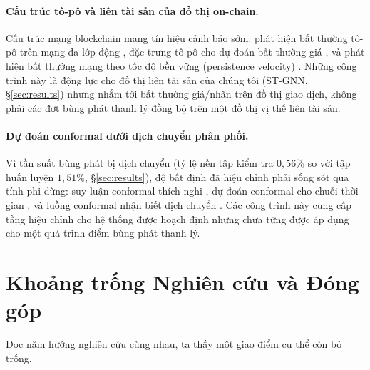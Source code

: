 \documentclass[11pt,a4paper]{article}
\begin{document}
\paragraph{Cấu trúc tô-pô và liên tài sản của đồ thị on-chain.} Cấu trúc mạng blockchain mang tín hiệu cảnh báo sớm: phát hiện bất thường tô-pô trên mạng đa lớp động \citep{oforiboateng2021topological}, đặc trưng tô-pô cho dự đoán bất thường giá \citep{xrp2026topological}, và phát hiện bất thường mạng theo tốc độ bền vững (persistence velocity) \citep{persistencevelocity2025}. Những công trình này là động lực cho đồ thị liên tài sản của chúng tôi (ST-GNN, \S\ref{sec:results}) nhưng nhắm tới bất thường giá/nhãn trên đồ thị giao dịch, không phải các đợt bùng phát thanh lý đồng bộ trên một đồ thị vị thế liên tài sản.

\paragraph{Dự đoán conformal dưới dịch chuyển phân phối.} Vì tần suất bùng phát bị dịch chuyển (tỷ lệ nền tập kiểm tra $0{,}56\%$ so với tập huấn luyện $1{,}51\%$, \S\ref{sec:results}), độ bất định đã hiệu chỉnh phải sống sót qua tính phi dừng: suy luận conformal thích nghi \citep{gibbs2021adaptive}, dự đoán conformal cho chuỗi thời gian \citep{zaffran2022adaptive}, và luồng conformal nhận biết dịch chuyển \citep{driftconformal2026}. Các công trình này cung cấp tầng hiệu chỉnh cho hệ thống được hoạch định nhưng chưa từng được áp dụng cho một quá trình điểm bùng phát thanh lý.

\section{Khoảng trống Nghiên cứu và Đóng góp}
\label{sec:gap}

Đọc năm hướng nghiên cứu cùng nhau, ta thấy một giao điểm cụ thể còn bỏ trống.
\end{document}
